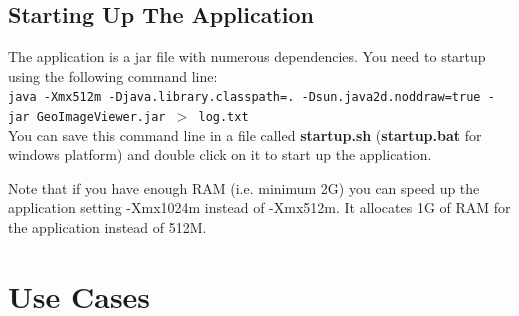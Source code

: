 \documentclass[12pt,a4paper,final]{report}
\begin{document}
\section{Starting Up The Application}
The application is a jar file with numerous dependencies.
You need to startup using the following command line:
\\
\texttt{\small{java -Xmx512m -Djava.library.classpath=. -Dsun.java2d.noddraw=true -jar GeoImageViewer.jar $>$ log.txt}}
\\
You can save this command line in a file called \textbf{startup.sh} (\textbf{startup.bat} for windows platform) and double click on it to start up the application.

Note that if you have enough RAM (i.e. minimum 2G) you can speed up the application setting -Xmx1024m instead of -Xmx512m.
It allocates 1G of RAM for the application instead of 512M.


\chapter{Use Cases}
\end{document}
